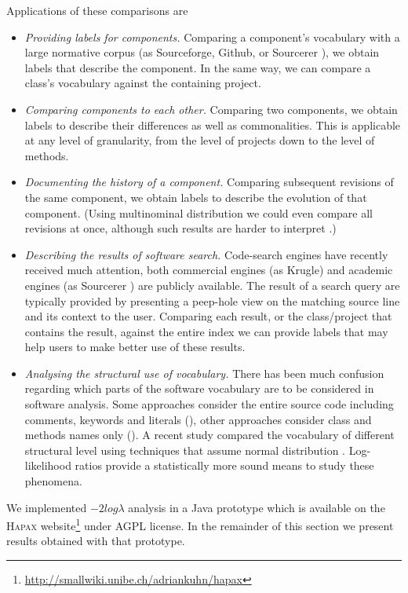 \documentclass[10pt]{book}
\begin{document}
Applications of these comparisons are
\begin{itemize}
\item \emph{Providing labels for components.} Comparing a component's vocabulary with a large normative corpus (as \eg Sourceforge, Github, or Sourcerer \cite{Bajrach09SUITE}), we obtain labels that describe the component. In the same way, we can compare a class's vocabulary against the containing project.
\item \emph{Comparing components to each other.} Comparing two components, we obtain labels to describe their differences as well as commonalities. This is applicable at any level of granularity, from the level of projects down to the level of methods.
\item \emph{Documenting the history of a component.} Comparing subsequent revisions of the same component, we obtain labels to describe the evolution of that component. (Using multinominal distribution we could even compare all revisions at once, although such results are harder to interpret \cite{Dunning}.)
\item \emph{Describing the results of software search.} Code-search engines have recently received much attention, both commercial engines (as \eg Krugle) and academic engines (as \eg Sourcerer \cite{Bajrach09SUITE}) are publicly available. The result of a search query are typically provided by presenting a peep-hole view on the matching source line and its context to the user. Comparing each result, or the class/project that contains the result, against the entire index we can provide labels that may help users to make better use of these results.
\item \emph{Analysing the structural use of vocabulary.} There has been much confusion regarding which parts of the software vocabulary are to be considered in software analysis. Some approaches consider the entire source code including comments, keywords and literals (\eg \cite{Kuhn08b,Kuhn07a}), other approaches consider class and methods names only (\eg \cite{Baldi08OOPSLA,EinarHoest}). A recent study compared the vocabulary of different structural level using techniques that assume normal distribution \cite{Linstead09SUITE}. Log-likelihood ratios provide a statistically more sound means to study these phenomena.
\end{itemize}

\noindent We implemented $-2log\lambda$ analysis in a Java prototype which is available on the \textsc{Hapax} website\footnote{\url{http://smallwiki.unibe.ch/adriankuhn/hapax}} under AGPL license. In the remainder of this section we present results obtained with that prototype.
\end{document}

